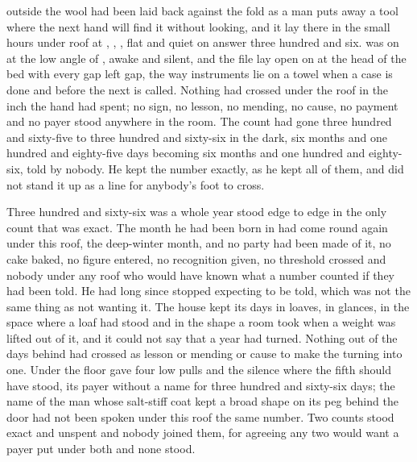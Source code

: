 
 outside the wool had been laid back against the fold as a man puts away a tool where the next hand will find it without looking, and it lay there in the small hours under  roof at , , , flat and quiet on answer three hundred and six.  was on  at the low angle of , awake and silent, and the file lay open on  at the head of the bed with every gap left gap, the way instruments lie on a towel when a case is done and before the next is called. Nothing had crossed under the roof in the inch the hand had spent; no sign, no lesson, no mending, no cause, no payment and no payer stood anywhere in the room. The count had gone three hundred and sixty-five to three hundred and sixty-six in the dark, six months and one hundred and eighty-five days becoming six months and one hundred and eighty-six, told by nobody. He kept the number exactly, as he kept all of them, and did not stand it up as a line for anybody's foot to cross.

Three hundred and sixty-six was a whole year stood edge to edge in the only count that was exact. The month he had been born in had come round again under this roof, the deep-winter month, and no party had been made of it, no cake baked, no figure entered, no recognition given, no threshold crossed and nobody under any roof who would have known what a number counted if they had been told. He had long since stopped expecting to be told, which was not the same thing as not wanting it. The house kept its days in loaves, in glances, in the space where a loaf had stood and in the shape a room took when a weight was lifted out of it, and it could not say that a year had turned. Nothing out of the days behind had crossed as lesson or mending or cause to make the turning into one. Under the floor  gave four low pulls and the silence where the fifth should have stood, its payer without a name for three hundred and sixty-six days; the name of the man whose salt-stiff coat kept a broad shape on its peg behind the door had not been spoken under this roof the same number. Two counts stood exact and unspent and nobody joined them, for agreeing any two would want a payer put under both and none stood.

